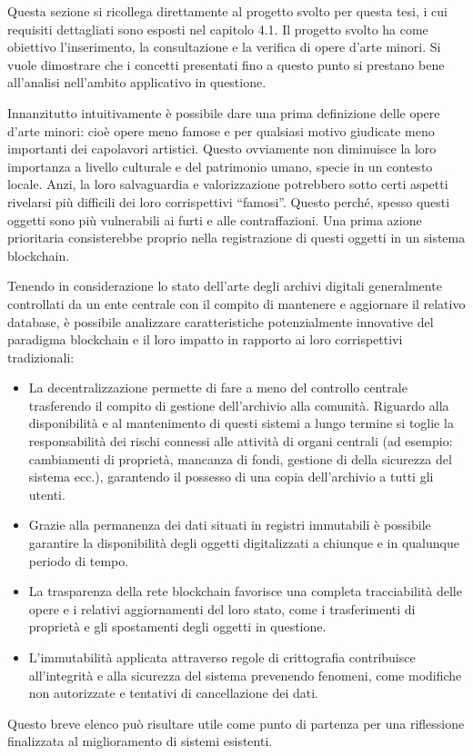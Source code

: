 Questa sezione si ricollega direttamente al progetto svolto per questa tesi, i cui requisiti dettagliati sono esposti nel capitolo 4.1. Il progetto svolto ha come obiettivo l’inserimento, la consultazione e la verifica di opere d’arte minori. Si vuole dimostrare che i concetti presentati fino a questo punto si prestano bene all'analisi nell’ambito applicativo in questione.

Innanzitutto intuitivamente è possibile dare una prima definizione delle opere d’arte minori: cioè opere meno famose e per qualsiasi motivo giudicate meno importanti dei capolavori artistici. Questo ovviamente non diminuisce la loro importanza a livello culturale e del patrimonio umano, specie in un contesto locale. Anzi, la loro salvaguardia e valorizzazione potrebbero sotto certi aspetti rivelarsi più difficili dei loro corrispettivi “famosi”. Questo perché, spesso questi oggetti sono più vulnerabili ai furti e alle contraffazioni. Una prima azione prioritaria consisterebbe proprio nella registrazione di questi oggetti in un sistema blockchain.

Tenendo in considerazione lo stato dell'arte degli archivi digitali generalmente controllati da un ente centrale con il compito di mantenere e aggiornare il relativo database, è possibile analizzare caratteristiche potenzialmente innovative del paradigma blockchain e il loro impatto in rapporto ai loro corrispettivi tradizionali:

\begin{itemize}
\item La decentralizzazione permette di fare a meno del controllo centrale trasferendo il compito di gestione dell’archivio alla comunità. Riguardo alla disponibilità e al mantenimento di questi sistemi a lungo termine si toglie la responsabilità dei rischi connessi alle attività di organi centrali (ad esempio: cambiamenti di proprietà, mancanza di fondi, gestione di della sicurezza del sistema ecc.), garantendo il possesso di una copia dell’archivio a tutti gli utenti. 
\item Grazie alla permanenza dei dati situati in registri immutabili è possibile garantire la disponibilità degli oggetti digitalizzati a chiunque e in qualunque periodo di tempo. 
\item La trasparenza della rete blockchain favorisce una completa tracciabilità delle opere e i relativi aggiornamenti del loro stato, come i trasferimenti di proprietà e gli spostamenti degli oggetti in questione.
\item L'immutabilità applicata attraverso regole di crittografia contribuisce all’integrità e alla sicurezza del sistema prevenendo fenomeni, come modifiche non autorizzate e tentativi di cancellazione dei dati.
\end{itemize}

Questo breve elenco può risultare utile come punto di partenza per una riflessione finalizzata al miglioramento di sistemi esistenti.